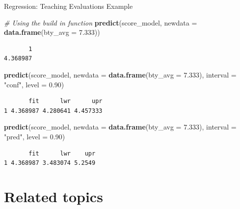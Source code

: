 \documentclass[
  ignorenonframetext,
]{beamer}
\newenvironment{Shaded}{\begin{snugshade}}{\end{snugshade}}
\newcommand{\AttributeTok}[1]{\textcolor[rgb]{0.13,0.29,0.53}{#1}}
\newcommand{\CommentTok}[1]{\textcolor[rgb]{0.56,0.35,0.01}{\textit{#1}}}
\newcommand{\FloatTok}[1]{\textcolor[rgb]{0.00,0.00,0.81}{#1}}
\newcommand{\FunctionTok}[1]{\textcolor[rgb]{0.13,0.29,0.53}{\textbf{#1}}}
\newcommand{\NormalTok}[1]{#1}
\newcommand{\StringTok}[1]{\textcolor[rgb]{0.31,0.60,0.02}{#1}}
\begin{document}
\begin{frame}[fragile]{Regression: Teaching Evaluations Example}
\protect\hypertarget{regression-teaching-evaluations-example-16}{}
\tiny

\begin{Shaded}
\begin{Highlighting}[]
\CommentTok{\# Using the build in function}
\FunctionTok{predict}\NormalTok{(score\_model, }\AttributeTok{newdata =} \FunctionTok{data.frame}\NormalTok{(}\AttributeTok{bty\_avg =} \FloatTok{7.333}\NormalTok{))}
\end{Highlighting}
\end{Shaded}

\begin{verbatim}
       1 
4.368987 
\end{verbatim}

\begin{Shaded}
\begin{Highlighting}[]
\FunctionTok{predict}\NormalTok{(score\_model, }\AttributeTok{newdata =} \FunctionTok{data.frame}\NormalTok{(}\AttributeTok{bty\_avg =} \FloatTok{7.333}\NormalTok{), }\AttributeTok{interval =} \StringTok{"conf"}\NormalTok{, }\AttributeTok{level =} \FloatTok{0.90}\NormalTok{)}
\end{Highlighting}
\end{Shaded}

\begin{verbatim}
       fit      lwr      upr
1 4.368987 4.280641 4.457333
\end{verbatim}

\begin{Shaded}
\begin{Highlighting}[]
\FunctionTok{predict}\NormalTok{(score\_model, }\AttributeTok{newdata =} \FunctionTok{data.frame}\NormalTok{(}\AttributeTok{bty\_avg =} \FloatTok{7.333}\NormalTok{), }\AttributeTok{interval =} \StringTok{"pred"}\NormalTok{, }\AttributeTok{level =} \FloatTok{0.90}\NormalTok{)}
\end{Highlighting}
\end{Shaded}

\begin{verbatim}
       fit      lwr    upr
1 4.368987 3.483074 5.2549
\end{verbatim}

\normalsize
\end{frame}

\hypertarget{related-topics}{%
\section{Related topics}\label{related-topics}}
\end{document}
